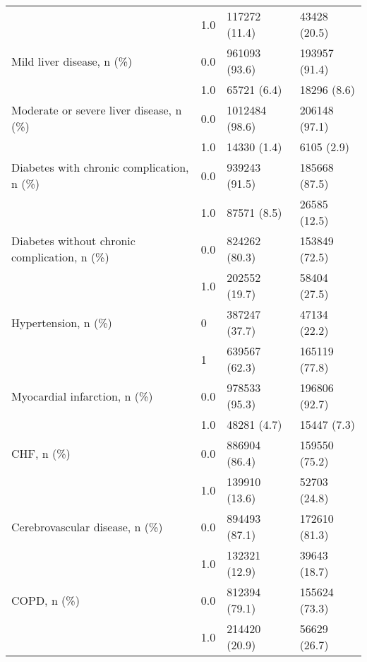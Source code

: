 \begin{tabular}{llll}
                                       & 1.0 &                         117272 (11.4) &       43428 (20.5) \\
Mild liver disease, n (\%) & 0.0 &                         961093 (93.6) &      193957 (91.4) \\
                                       & 1.0 &                           65721 (6.4) &        18296 (8.6) \\
Moderate or severe liver disease, n (\%) & 0.0 &                        1012484 (98.6) &      206148 (97.1) \\
                                       & 1.0 &                           14330 (1.4) &         6105 (2.9) \\
Diabetes with chronic complication, n (\%) & 0.0 &                         939243 (91.5) &      185668 (87.5) \\
                                       & 1.0 &                           87571 (8.5) &       26585 (12.5) \\
Diabetes without chronic complication, n (\%) & 0.0 &                         824262 (80.3) &      153849 (72.5) \\
                                       & 1.0 &                         202552 (19.7) &       58404 (27.5) \\
Hypertension, n (\%) & 0 &                         387247 (37.7) &       47134 (22.2) \\
                                       & 1 &                         639567 (62.3) &      165119 (77.8) \\
Myocardial infarction, n (\%) & 0.0 &                         978533 (95.3) &      196806 (92.7) \\
                                       & 1.0 &                           48281 (4.7) &        15447 (7.3) \\
CHF, n (\%) & 0.0 &                         886904 (86.4) &      159550 (75.2) \\
                                       & 1.0 &                         139910 (13.6) &       52703 (24.8) \\
Cerebrovascular disease, n (\%) & 0.0 &                         894493 (87.1) &      172610 (81.3) \\
                                       & 1.0 &                         132321 (12.9) &       39643 (18.7) \\
COPD, n (\%) & 0.0 &                         812394 (79.1) &      155624 (73.3) \\
                                       & 1.0 &                         214420 (20.9) &       56629 (26.7) \\

\end{tabular}
